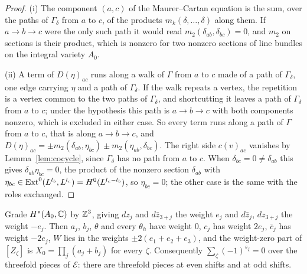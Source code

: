 \begin{proof}
(i) The component $(a,c)$ of the Maurer--Cartan equation is the sum, over the paths of $\Gamma_{\delta}$ from $a$ to $c$, of the products $m_{k}(\delta,\dots,\delta)$ along them. If $a\to b\to c$ were the only such path it would read $m_{2}(\delta_{ab},\delta_{bc})=0$, and $m_{2}$ on sections is their product, which is nonzero for two nonzero sections of line bundles on the integral variety $A_{0}$.

(ii) A term of $D(\eta)_{ac}$ runs along a walk of $\Gamma$ from $a$ to $c$ made of a path of $\Gamma_{\delta}$, one edge carrying $\eta$ and a path of $\Gamma_{\delta}$. If the walk repeats a vertex, the repetition is a vertex common to the two paths of $\Gamma_{\delta}$, and shortcutting it leaves a path of $\Gamma_{\delta}$ from $a$ to $c$; under the hypothesis this path is $a\to b\to c$ with both components nonzero, which is excluded in either case. So every term runs along a path of $\Gamma$ from $a$ to $c$, that is along $a\to b\to c$, and $D(\eta)_{ac}=\pm m_{2}(\delta_{ab},\eta_{bc})\pm m_{2}(\eta_{ab},\delta_{bc})$. The right side $c(v)_{ac}$ vanishes by Lemma~\ref{lem:cocycle}, since $\Gamma_{\delta}$ has no path from $a$ to $c$. When $\delta_{bc}=0\ne\delta_{ab}$ this gives $\delta_{ab}\eta_{bc}=0$, the product of the nonzero section $\delta_{ab}$ with $\eta_{bc}\in\mathrm{Ext}^{0}(L^{l_{b}},L^{l_{c}})=H^{0}(L^{l_{c}-l_{b}})$, so $\eta_{bc}=0$; the other case is the same with the roles exchanged.
\end{proof}

\begin{lemma}\label{lem:parity}
Grade $H^{*}(A_{0},\mathbb{C})$ by $\mathbb{Z}^{3}$, giving $dz_{j}$ and $d\bar z_{3+j}$ the weight $e_{j}$ and $d\bar z_{j}$, $dz_{3+j}$ the weight $-e_{j}$. Then $a_{j}$, $b_{j}$, $\theta$ and every $\theta_{h}$ have weight $0$, $c_{j}$ has weight $2e_{j}$, $\bar c_{j}$ has weight $-2e_{j}$, $W$ lies in the weights $\pm2(e_{1}+e_{2}+e_{3})$, and the weight-zero part of $[Z_{\zeta}]$ is $X_{0}=\prod_{j}(a_{j}+b_{j})$ for every $\zeta$. Consequently $\sum_{\zeta}(-1)^{s_{\zeta}}=0$ over the threefold pieces of $\mathcal{E}$: there are threefold pieces at even shifts and at odd shifts.
\end{lemma}

